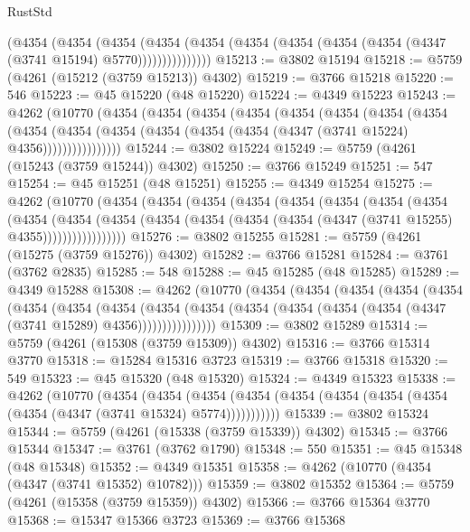 \begin{lexlean}{RustStd}
\begin{coremodule}
              (@4354
                (@4354
                  (@4354
                    (@4354
                      (@4354 (@4354 (@4354 (@4354 (@4354 (@4347 (@3741 @15194) @5770)))))))))))))))
@15213 := @3802 @15194
@15218 := @5759 (@4261 (@15212 (@3759 @15213)) @4302)
@15219 := @3766 @15218
@15220 := 546
@15223 := @45 @15220 (@48 @15220)
@15224 := @4349 @15223
@15243 := @4262
    (@10770
      (@4354
        (@4354
          (@4354
            (@4354
              (@4354
                (@4354
                  (@4354
                    (@4354
                      (@4354
                        (@4354
                          (@4354 (@4354 (@4354 (@4354 (@4347 (@3741 @15224) @4356))))))))))))))))
@15244 := @3802 @15224
@15249 := @5759 (@4261 (@15243 (@3759 @15244)) @4302)
@15250 := @3766 @15249
@15251 := 547
@15254 := @45 @15251 (@48 @15251)
@15255 := @4349 @15254
@15275 := @4262
    (@10770
      (@4354
        (@4354
          (@4354
            (@4354
              (@4354
                (@4354
                  (@4354
                    (@4354
                      (@4354
                        (@4354
                          (@4354
                            (@4354 (@4354 (@4354 (@4354 (@4347 (@3741 @15255) @4355)))))))))))))))))
@15276 := @3802 @15255
@15281 := @5759 (@4261 (@15275 (@3759 @15276)) @4302)
@15282 := @3766 @15281
@15284 := @3761 (@3762 @2835)
@15285 := 548
@15288 := @45 @15285 (@48 @15285)
@15289 := @4349 @15288
@15308 := @4262
    (@10770
      (@4354
        (@4354
          (@4354
            (@4354
              (@4354
                (@4354
                  (@4354
                    (@4354
                      (@4354
                        (@4354
                          (@4354 (@4354 (@4354 (@4354 (@4347 (@3741 @15289) @4356))))))))))))))))
@15309 := @3802 @15289
@15314 := @5759 (@4261 (@15308 (@3759 @15309)) @4302)
@15316 := @3766 @15314 @3770
@15318 := @15284 @15316 @3723
@15319 := @3766 @15318
@15320 := 549
@15323 := @45 @15320 (@48 @15320)
@15324 := @4349 @15323
@15338 := @4262
    (@10770
      (@4354
        (@4354
          (@4354 (@4354 (@4354 (@4354 (@4354 (@4354 (@4354 (@4347 (@3741 @15324) @5774)))))))))))
@15339 := @3802 @15324
@15344 := @5759 (@4261 (@15338 (@3759 @15339)) @4302)
@15345 := @3766 @15344
@15347 := @3761 (@3762 @1790)
@15348 := 550
@15351 := @45 @15348 (@48 @15348)
@15352 := @4349 @15351
@15358 := @4262 (@10770 (@4354 (@4347 (@3741 @15352) @10782)))
@15359 := @3802 @15352
@15364 := @5759 (@4261 (@15358 (@3759 @15359)) @4302)
@15366 := @3766 @15364 @3770
@15368 := @15347 @15366 @3723
@15369 := @3766 @15368

\end{coremodule}
\end{lexlean}
